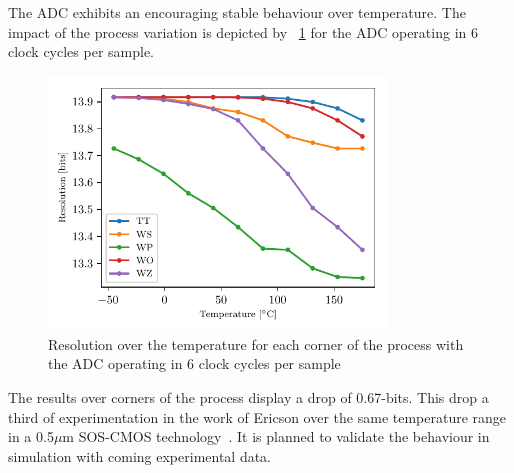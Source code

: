 The ADC exhibits an encouraging stable behaviour over temperature. The impact of the process variation is depicted by \figurename~\ref{fig:adc-res-schematic-temp-corners} for the ADC operating in 6 clock cycles per sample.

\begin{figure}[htp]
    \centering
    \includegraphics[width=0.8\textwidth]{Chapter5/Figs/preliminary/adc_real_ota_osr6_temp-corners.pdf}
    \caption{Resolution over the temperature for each corner of the process with the ADC operating in 6 clock cycles per sample}
    \label{fig:adc-res-schematic-temp-corners}
\end{figure}

The results over corners of the process display a drop of 0.67-bits. This drop a third of experimentation in the work of Ericson over the same temperature range in a 0.5$\mu$m SOS-CMOS technology~\cite{Ericson2004}. It is planned to validate the behaviour in simulation with coming experimental data.